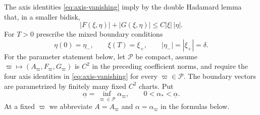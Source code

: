 \documentclass[11pt]{amsart}
\numberwithin{equation}{section}
\theoremstyle{definition}
\theoremstyle{remark}
\begin{document}
The axis identities \eqref{eq:axis-vanishing} imply by the double Hadamard
lemma that, in a smaller bidisk,
\begin{equation}\label{eq:double-hadamard}
 |F(\xi,\eta)|+|G(\xi,\eta)|\le C|\xi|\,|\eta|.
\end{equation}
For $T>0$ prescribe the mixed boundary conditions
\begin{equation}\label{eq:mixed-boundary}
 \eta(0)=\eta_-,\qquad \xi(T)=\xi_+,
 \qquad |\eta_-|=|\xi_+|=\delta.
\end{equation}
For the parameter statement below, let $\mathcal P$ be compact, assume
$\varpi\mapsto(A_\varpi,F_\varpi,G_\varpi)$ is $C^2$ in the preceding
coefficient norms, and require the four axis identities in
\eqref{eq:axis-vanishing} for every $\varpi\in\mathcal P$.  The boundary
vectors are parametrized by finitely many fixed $C^2$ charts.  Put
\begin{equation}\label{eq:common-passage-rate}
 \underline\alpha=\inf_{\varpi\in\mathcal P}\alpha_\varpi,
 \qquad 0<\alpha_*<\underline\alpha.
\end{equation}
At a fixed $\varpi$ we abbreviate $A=A_\varpi$ and
$\alpha=\alpha_\varpi$ in the formulas below.
\end{document}
